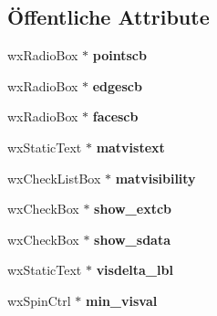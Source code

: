 \subsection*{Öffentliche Attribute}
\begin{DoxyCompactItemize}
\item 
\hypertarget{classViewpropBox_accd1605fd25d212ecec8863826c0083b}{wx\-Radio\-Box $\ast$ {\bfseries pointscb}}\label{classViewpropBox_accd1605fd25d212ecec8863826c0083b}

\item 
\hypertarget{classViewpropBox_a28aea1504bd563435b24ac5ca6caecd0}{wx\-Radio\-Box $\ast$ {\bfseries edgescb}}\label{classViewpropBox_a28aea1504bd563435b24ac5ca6caecd0}

\item 
\hypertarget{classViewpropBox_a7e5ca2086334dfaab09816e9c6c35b2f}{wx\-Radio\-Box $\ast$ {\bfseries facescb}}\label{classViewpropBox_a7e5ca2086334dfaab09816e9c6c35b2f}

\item 
\hypertarget{classViewpropBox_ac9a127aa0bda83897d08ca29fae3ca48}{wx\-Static\-Text $\ast$ {\bfseries matvistext}}\label{classViewpropBox_ac9a127aa0bda83897d08ca29fae3ca48}

\item 
\hypertarget{classViewpropBox_a2c0875c6ebfa1b0cfe66ea7da77dd461}{wx\-Check\-List\-Box $\ast$ {\bfseries matvisibility}}\label{classViewpropBox_a2c0875c6ebfa1b0cfe66ea7da77dd461}

\item 
\hypertarget{classViewpropBox_a7787f6442c883590efaa88001c72ce57}{wx\-Check\-Box $\ast$ {\bfseries show\-\_\-extcb}}\label{classViewpropBox_a7787f6442c883590efaa88001c72ce57}

\item 
\hypertarget{classViewpropBox_ac423e0f66cfa019fd1d70af577fb5eea}{wx\-Check\-Box $\ast$ {\bfseries show\-\_\-sdata}}\label{classViewpropBox_ac423e0f66cfa019fd1d70af577fb5eea}

\item 
\hypertarget{classViewpropBox_ae1ba70044fa3d3d4a97fd3c85781b5c3}{wx\-Static\-Text $\ast$ {\bfseries visdelta\-\_\-lbl}}\label{classViewpropBox_ae1ba70044fa3d3d4a97fd3c85781b5c3}

\item 
\hypertarget{classViewpropBox_a9dabfccda6d40212c4b6c2afcd02b108}{wx\-Spin\-Ctrl $\ast$ {\bfseries min\-\_\-visval}}\label{classViewpropBox_a9dabfccda6d40212c4b6c2afcd02b108}


\end{DoxyCompactItemize}
